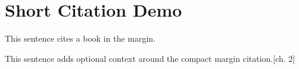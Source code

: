 \documentclass[wide-notes]{arthur-book}
\begin{document}
\chapter{Short Citation Demo}

This sentence cites a book in the margin.

This sentence adds optional context around the compact margin citation.[ch. 2]

\printbibliography
\end{document}

